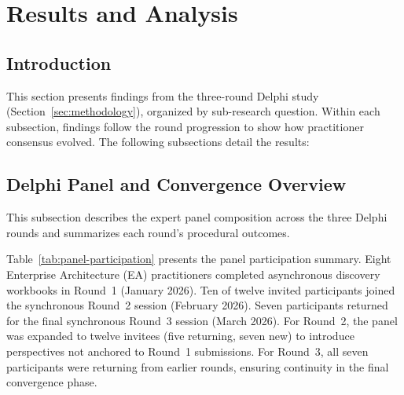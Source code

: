 
\section{Results and Analysis}\label{sec:results}

\subsection*{Introduction}

This section presents findings from the three-round Delphi study
(Section~\ref{sec:methodology}), organized by sub-research question. Within
each subsection, findings follow the round progression to show how practitioner
consensus evolved. The following subsections detail the results:

\localtableofcontents\clearpage

\subsection{Delphi Panel and Convergence Overview}\label{subsec:panel-overview}

This subsection describes the expert panel composition across the three Delphi
rounds and summarizes each round's procedural outcomes.

Table~\ref{tab:panel-participation} presents the panel participation summary.
Eight Enterprise Architecture (EA) practitioners completed asynchronous discovery workbooks in Round~1
(January 2026). Ten of twelve invited participants joined the synchronous
Round~2 session (February 2026). Seven participants returned for the final
synchronous Round~3 session (March 2026). For Round~2, the panel was expanded to twelve invitees (five returning, seven
new) to introduce perspectives not anchored to Round~1 submissions. For
Round~3, all seven participants were returning from earlier rounds, ensuring
continuity in the final convergence phase.

